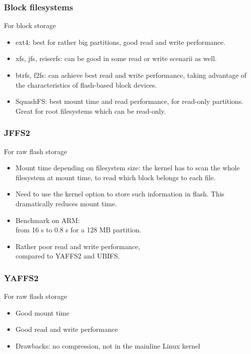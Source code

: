 \begin{frame}
\frametitle{Block filesystems}
For block storage
\begin{itemize}
\item ext4: best for rather big partitions, good read and write
      performance.
\item xfs, jfs, reiserfs: can be good in some read or write scenarii
      as well.
\item btrfs, f2fs: can achieve best read and write performance,
      taking advantage of the characteristics of flash-based block
      devices.
\item SquashFS: best mount time and read performance, for read-only
      partitions. Great for root filesystems which can be read-only.
\end{itemize}
\end{frame}

\begin{frame}
\frametitle{JFFS2}
For raw flash storage
\begin{itemize}
\item Mount time depending on filesystem size: the kernel has to
      scan the whole filesystem at mount time, to read which block
      belongs to each file.
\item Need to use the  kernel option
      to store such information in flash. This dramatically reduces
      mount time.
\item Benchmark on ARM:\\
      from 16 s to 0.8 s for a 128 MB partition.
\item Rather poor read and write performance,\\
      compared to YAFFS2 and UBIFS.
\end{itemize}
\end{frame}

\begin{frame}
\frametitle{YAFFS2}
For raw flash storage
\begin{itemize}
\item Good mount time
\item Good read and write performance
\item Drawbacks: no compression, not in the mainline Linux kernel
\end{itemize}
\end{frame}

